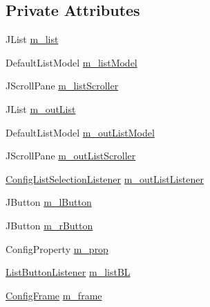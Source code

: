 \subsection*{Private Attributes}
\begin{DoxyCompactItemize}
\item 
J\-List \hyperlink{classorg_1_1jgap_1_1gui_1_1_config_frame_1_1_list_group_a17f9cab69ff7ee57fb0f912166d3c290}{m\-\_\-list}
\item 
Default\-List\-Model \hyperlink{classorg_1_1jgap_1_1gui_1_1_config_frame_1_1_list_group_a81d5c0b9d3ee2b427334acb2409d2d83}{m\-\_\-list\-Model}
\item 
J\-Scroll\-Pane \hyperlink{classorg_1_1jgap_1_1gui_1_1_config_frame_1_1_list_group_a5b2e39f563ff0c708c8119bc42281a53}{m\-\_\-list\-Scroller}
\item 
J\-List \hyperlink{classorg_1_1jgap_1_1gui_1_1_config_frame_1_1_list_group_a89615146e965a88eb3dc8923502925db}{m\-\_\-out\-List}
\item 
Default\-List\-Model \hyperlink{classorg_1_1jgap_1_1gui_1_1_config_frame_1_1_list_group_aae4663907211b84ba42985bc2f1dc7f6}{m\-\_\-out\-List\-Model}
\item 
J\-Scroll\-Pane \hyperlink{classorg_1_1jgap_1_1gui_1_1_config_frame_1_1_list_group_ae61ec42f592b7ecc88970b1718feecd9}{m\-\_\-out\-List\-Scroller}
\item 
\hyperlink{classorg_1_1jgap_1_1gui_1_1_config_frame_1_1_config_list_selection_listener}{Config\-List\-Selection\-Listener} \hyperlink{classorg_1_1jgap_1_1gui_1_1_config_frame_1_1_list_group_a3b8a0efecbafd2132aca0bb337ff45ae}{m\-\_\-out\-List\-Listener}
\item 
J\-Button \hyperlink{classorg_1_1jgap_1_1gui_1_1_config_frame_1_1_list_group_af4b650bb5707cd0b8d8f68392654e59e}{m\-\_\-l\-Button}
\item 
J\-Button \hyperlink{classorg_1_1jgap_1_1gui_1_1_config_frame_1_1_list_group_a2bf8a13a1113df4ff6ce4cb5c64d33ac}{m\-\_\-r\-Button}
\item 
Config\-Property \hyperlink{classorg_1_1jgap_1_1gui_1_1_config_frame_1_1_list_group_a7fe18a08d38e17673c341e54276ea688}{m\-\_\-prop}
\item 
\hyperlink{classorg_1_1jgap_1_1gui_1_1_config_frame_1_1_list_button_listener}{List\-Button\-Listener} \hyperlink{classorg_1_1jgap_1_1gui_1_1_config_frame_1_1_list_group_af1bab47308f165348d655b53ffceb9f8}{m\-\_\-list\-B\-L}
\item 
\hyperlink{classorg_1_1jgap_1_1gui_1_1_config_frame}{Config\-Frame} \hyperlink{classorg_1_1jgap_1_1gui_1_1_config_frame_1_1_list_group_a633005385e87ab249caedcf202ec3794}{m\-\_\-frame}
\end{DoxyCompactItemize}



